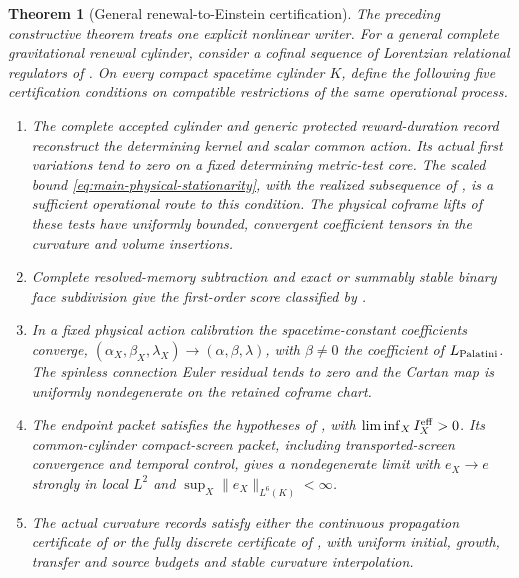 \documentclass[11pt]{article}
\newtheorem{theorem}{Theorem}[section]
\theoremstyle{definition}
\theoremstyle{remark}
\begin{document}
\begin{theorem}[General renewal-to-Einstein certification]
\label{thm:main-renewal-einstein}
The preceding constructive theorem treats one explicit nonlinear writer.
For a general complete gravitational renewal cylinder, consider a cofinal
sequence of Lorentzian relational regulators of .  On every
compact spacetime cylinder $K$, define the following five certification
conditions on compatible restrictions of the same operational process.
\begin{enumerate}[label=\textup{(E\arabic*)},leftmargin=3em]
\item The complete accepted cylinder and generic protected reward-duration record
      reconstruct the determining kernel and scalar common action.  Its actual
      first variations tend to zero on a fixed determining metric-test core.
      The scaled bound \eqref{eq:main-physical-stationarity}, with the realized
      subsequence of , is a sufficient
      operational route to this condition.  The physical coframe lifts of these
      tests have uniformly bounded, convergent coefficient tensors in the
      curvature and volume insertions.
\item Complete resolved-memory subtraction and exact or summably stable binary
      face subdivision give the first-order score classified by
      .
\item In a fixed physical action calibration the spacetime-constant
      coefficients converge,
      $(\alpha_X,\beta_X,\lambda_X)\to(\alpha,\beta,\lambda)$, with
      $\beta\ne0$ the coefficient of $L_{\rm Palatini}$.  The spinless
      connection Euler residual tends to zero and the Cartan map is uniformly
      nondegenerate on the retained coframe chart.
\item The endpoint packet satisfies the hypotheses of
      , with
      $\liminf_X I_X^{\rm eff}>0$.  Its common-cylinder compact-screen packet,
      including transported-screen convergence and temporal control, gives a
      nondegenerate limit with $e_X\to e$ strongly in local $L^2$ and
      $\sup_X\|e_X\|_{L^6(K)}<\infty$.
\item The actual curvature records satisfy either the continuous propagation
      certificate of  or the fully discrete
      certificate of , with uniform initial,
      growth, transfer and source budgets and stable curvature interpolation.

\end{enumerate}
\end{theorem}
\end{document}
